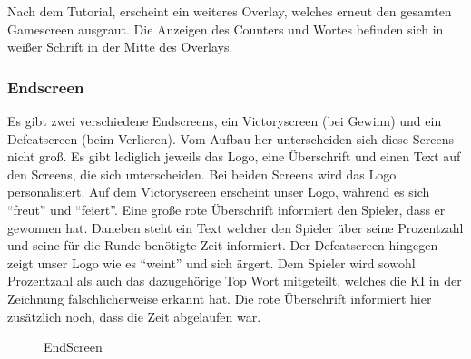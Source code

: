 \documentclass[11pt]{article}
\begin{document}
Nach dem Tutorial, erscheint ein weiteres Overlay, welches erneut den gesamten Gamescreen ausgraut. Die Anzeigen des Counters und Wortes befinden sich in weißer Schrift in der Mitte des Overlays.


\subsubsection{Endscreen}

Es gibt zwei verschiedene Endscreens, ein Victoryscreen (bei Gewinn) und ein Defeatscreen (beim Verlieren). Vom Aufbau her unterscheiden sich diese Screens nicht groß. Es gibt lediglich jeweils das Logo, eine Überschrift und einen Text auf den Screens, die sich unterscheiden. Bei beiden Screens wird das Logo personalisiert. 
Auf dem Victoryscreen erscheint unser Logo, während es sich “freut” und “feiert”. Eine große rote Überschrift informiert den Spieler, dass er gewonnen hat. Daneben steht ein Text welcher den Spieler über seine Prozentzahl und seine für die Runde benötigte Zeit informiert. 
Der Defeatscreen hingegen zeigt unser Logo wie es “weint” und sich ärgert. Dem Spieler wird sowohl Prozentzahl als auch das dazugehörige Top Wort mitgeteilt, welches die KI in der Zeichnung fälschlicherweise erkannt hat. Die rote Überschrift informiert hier zusätzlich noch, dass die Zeit abgelaufen war. 

\begin{figure}[h]
\centering
\caption{EndScreen}
\end{figure}
\end{document}
